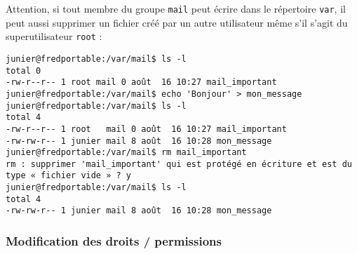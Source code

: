 \documentclass[
  11pt,
]{article}
\begin{document}
Attention, si tout membre du groupe \texttt{mail} peut écrire dans le
répertoire \texttt{var}, il peut aussi supprimer un fichier créé par un
autre utilisateur même s'il s'agit du superutilisateur \texttt{root} :

\begin{verbatim}
junier@fredportable:/var/mail$ ls -l
total 0
-rw-r--r-- 1 root mail 0 août  16 10:27 mail_important
junier@fredportable:/var/mail$ echo 'Bonjour' > mon_message
junier@fredportable:/var/mail$ ls -l
total 4
-rw-r--r-- 1 root   mail 0 août  16 10:27 mail_important
-rw-rw-r-- 1 junier mail 8 août  16 10:28 mon_message
junier@fredportable:/var/mail$ rm mail_important
rm : supprimer 'mail_important' qui est protégé en écriture et est du type « fichier vide » ? y
junier@fredportable:/var/mail$ ls -l
total 4
-rw-rw-r-- 1 junier mail 8 août  16 10:28 mon_message
\end{verbatim}

\hypertarget{modification-des-droits-permissions}{%
\subsubsection{Modification des droits /
permissions}\label{modification-des-droits-permissions}}
\end{document}
